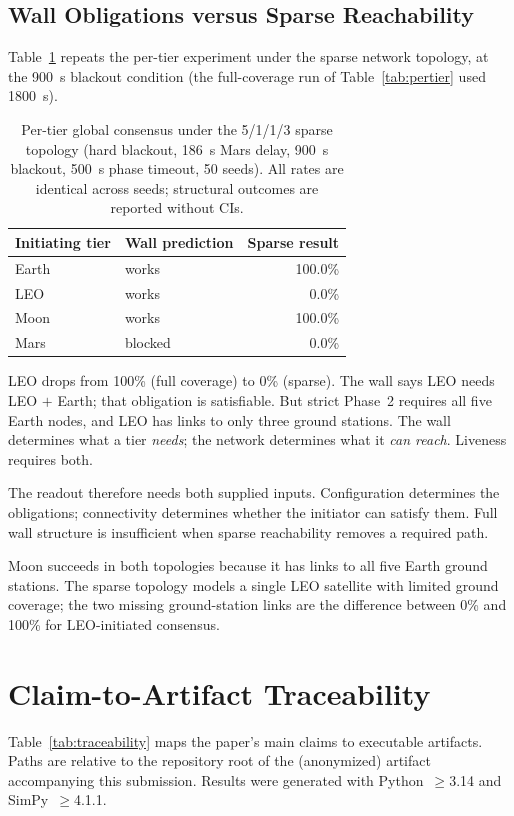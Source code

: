 \documentclass[letterpaper,twocolumn,10pt]{article}
\begin{document}
\subsection{Wall Obligations versus Sparse Reachability}
\label{sec:reachability}

Table~\ref{tab:sparse} repeats the per-tier experiment under the sparse network topology, at the 900~s blackout condition (the full-coverage run of Table~\ref{tab:pertier} used 1800~s).

\begin{table}[t]
\centering
\small
\caption{Per-tier global consensus under the 5/1/1/3 sparse topology (hard blackout, 186~s Mars delay, 900~s blackout, 500~s phase timeout, 50 seeds). All rates are identical across seeds; structural outcomes are reported without CIs.}
\label{tab:sparse}
\begin{tabular}{llr}
\toprule
Initiating tier & Wall prediction & Sparse result \\
\midrule
Earth & works & 100.0\% \\
LEO & works & 0.0\% \\
Moon & works & 100.0\% \\
Mars & blocked & 0.0\% \\
\bottomrule
\end{tabular}
\end{table}


LEO drops from 100\% (full coverage) to 0\% (sparse). The wall says LEO needs LEO $+$ Earth; that obligation is satisfiable. But strict Phase~2 requires all five Earth nodes, and LEO has links to only three ground stations. The wall determines what a tier \emph{needs}; the network determines what it \emph{can reach}. Liveness requires both.

The readout therefore needs both supplied inputs. Configuration determines the obligations; connectivity determines whether the initiator can satisfy them. Full wall structure is insufficient when sparse reachability removes a required path.

Moon succeeds in both topologies because it has links to all five Earth ground stations. The sparse topology models a single LEO satellite with limited ground coverage; the two missing ground-station links are the difference between 0\% and 100\% for LEO-initiated consensus.



\section{Claim-to-Artifact Traceability}
\label{app:traceability}
Table~\ref{tab:traceability} maps the paper's main claims to executable artifacts. Paths are relative to the repository root of the (anonymized) artifact accompanying this submission. Results were generated with Python~$\ge$3.14 and SimPy~$\ge$4.1.1.
\balance
\end{document}

